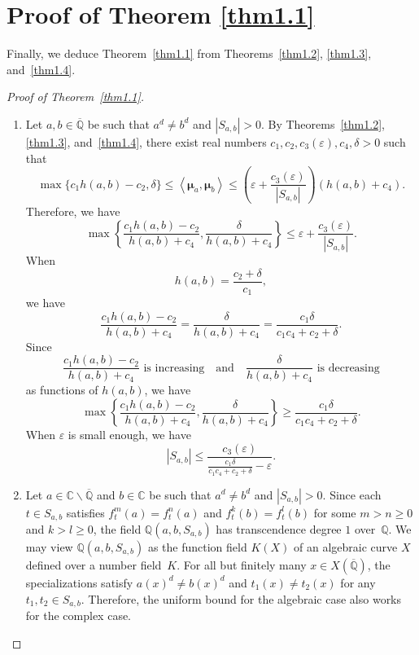 \documentclass[10pt,a4paper]{amsart}
\numberwithin{equation}{section}
\theoremstyle{plain}
\theoremstyle{definition}
\theoremstyle{remark}
\newcommand{\C}{\mathbb C}
\newcommand{\Q}{\mathbb Q}
\renewcommand{\bar}{\overline}
\begin{document}
\section{Proof of Theorem \texorpdfstring{\ref{thm1.1}}{1.1}}\label{sec5}

Finally, we deduce Theorem~\ref{thm1.1} from Theorems~\ref{thm1.2},
\ref{thm1.3}, and~\ref{thm1.4}.

\begin{proof}[Proof of Theorem~\ref{thm1.1}]\leavevmode
  \begin{enumerate}[wide]
    \item Let $a,b\in\bar{\Q}$ be 
such that $a^{d}\neq b^{d}$ and $|S_{a,b}|>0$. By Theorems~\ref{thm1.2},
\ref{thm1.3}, and~\ref{thm1.4}, there exist real numbers
$c_{1},c_{2},c_{3}(\varepsilon),c_{4},\delta>0$
such that
\[
\max\{c_{1}h(a,b)-c_{2},\delta\}\leq\left\langle \boldsymbol{\mu}_{a},\boldsymbol{\mu}_{b}\right\rangle \leq\left(\varepsilon+\frac{c_{3}(\varepsilon)}{|S_{a,b}|}\right)(h(a,b)+c_{4}).
\]
Therefore, we have
\[
\max\left\{ \frac{c_{1}h(a,b)-c_{2}}{h(a,b)+c_{4}},\frac{\delta}{h(a,b)+c_{4}}\right\} \leq\varepsilon+\frac{c_{3}(\varepsilon)}{|S_{a,b}|}.
\]
When
\[
h(a,b)=\frac{c_{2}+\delta}{c_{1}},
\]
we have
\[
\frac{c_{1}h(a,b)-c_{2}}{h(a,b)+c_{4}}=\frac{\delta}{h(a,b)+c_{4}}=\frac{c_{1}\delta}{c_{1}c_{4}+c_{2}+\delta}.
\]
Since
\[
\frac{c_{1}h(a,b)-c_{2}}{h(a,b)+c_{4}}\text{ is increasing}\quad\text{and}\quad\frac{\delta}{h(a,b)+c_{4}}\text{ is decreasing}
\]
as functions of $h(a,b)$, we have
\[
\max\left\{ \frac{c_{1}h(a,b)-c_{2}}{h(a,b)+c_{4}},\frac{\delta}{h(a,b)+c_{4}}\right\} \geq\frac{c_{1}\delta}{c_{1}c_{4}+c_{2}+\delta}.
\]
When $\varepsilon$ is small enough, we have
\[
|S_{a,b}|\leq\frac{c_{3}(\varepsilon)}{\frac{c_{1}\delta}{c_{1}c_{4}+c_{2}+\delta}-\varepsilon}.
\]

\item Let $a\in\C\backslash\bar{\Q}$ and $b\in\C$ be 
such that $a^{d}\neq b^{d}$ and $|S_{a,b}|>0$. Since each $t\in S_{a,b}$
satisfies $f_{t}^{m}(a)=f_{t}^{n}(a)$ and $f_{t}^{k}(b)=f_{t}^{l}(b)$
for some $m>n\geq0$ and $k>l\geq0$, the field $\Q(a,b,S_{a,b})$
has transcendence degree $1$ over~$\Q$. We may view $\Q(a,b,S_{a,b})$
as the function field $K(X)$ of an algebraic curve $X$ defined over
a number field~$K$. For all but finitely many $x\in X(\bar{\Q})$,
the specializations satisfy $a(x)^{d}\neq b(x)^{d}$ and $t_{1}(x)\neq t_{2}(x)$
for any $t_{1},t_{2}\in S_{a,b}$. Therefore, the uniform bound for
the algebraic case also works for the complex case.
\hfill\qedhere
\end{enumerate}
\end{proof}
\end{document}
